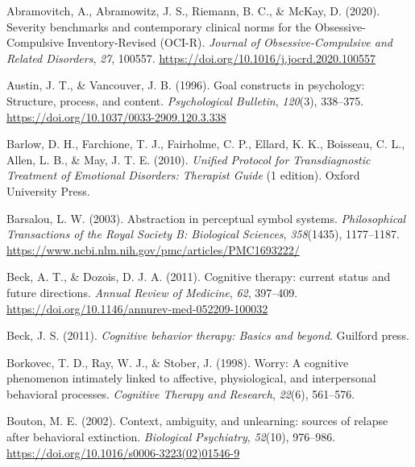 \documentclass[
  man,floatsintext]{apa7}
\newlength{\cslhangindent}
\newlength{\cslentryspacingunit} %
\newenvironment{CSLReferences}[2] %
 {%
  \setlength{\parindent}{0pt}
  \ifodd #1
  \let\oldpar\par
  \def\par{\hangindent=\cslhangindent\oldpar}
  \fi
  \setlength{\parskip}{#2\cslentryspacingunit}
 }%
 {}
\begin{document}
\hypertarget{refs}{}
\begin{CSLReferences}{1}{0}
\leavevmode{}%
Abramovitch, A., Abramowitz, J. S., Riemann, B. C., \& McKay, D. (2020). Severity benchmarks and contemporary clinical norms for the Obsessive-Compulsive Inventory-Revised (OCI-R). \emph{Journal of Obsessive-Compulsive and Related Disorders}, \emph{27}, 100557. \url{https://doi.org/10.1016/j.jocrd.2020.100557}

\leavevmode{}%
Austin, J. T., \& Vancouver, J. B. (1996). Goal constructs in psychology: Structure, process, and content. \emph{Psychological Bulletin}, \emph{120}(3), 338--375. \url{https://doi.org/10.1037/0033-2909.120.3.338}

\leavevmode{}%
Barlow, D. H., Farchione, T. J., Fairholme, C. P., Ellard, K. K., Boisseau, C. L., Allen, L. B., \& May, J. T. E. (2010). \emph{Unified Protocol for Transdiagnostic Treatment of Emotional Disorders: Therapist Guide} (1 edition). Oxford University Press.

\leavevmode{}%
Barsalou, L. W. (2003). Abstraction in perceptual symbol systems. \emph{Philosophical Transactions of the Royal Society B: Biological Sciences}, \emph{358}(1435), 1177--1187. \url{https://www.ncbi.nlm.nih.gov/pmc/articles/PMC1693222/}

\leavevmode{}%
Beck, A. T., \& Dozois, D. J. A. (2011). Cognitive therapy: current status and future directions. \emph{Annual Review of Medicine}, \emph{62}, 397--409. \url{https://doi.org/10.1146/annurev-med-052209-100032}

\leavevmode{}%
Beck, J. S. (2011). \emph{Cognitive behavior therapy: Basics and beyond}. Guilford press.

\leavevmode{}%
Borkovec, T. D., Ray, W. J., \& Stober, J. (1998). Worry: A cognitive phenomenon intimately linked to affective, physiological, and interpersonal behavioral processes. \emph{Cognitive Therapy and Research}, \emph{22}(6), 561--576.

\leavevmode{}%
Bouton, M. E. (2002). Context, ambiguity, and unlearning: sources of relapse after behavioral extinction. \emph{Biological Psychiatry}, \emph{52}(10), 976--986. \url{https://doi.org/10.1016/s0006-3223(02)01546-9}


\end{CSLReferences}
\end{document}
